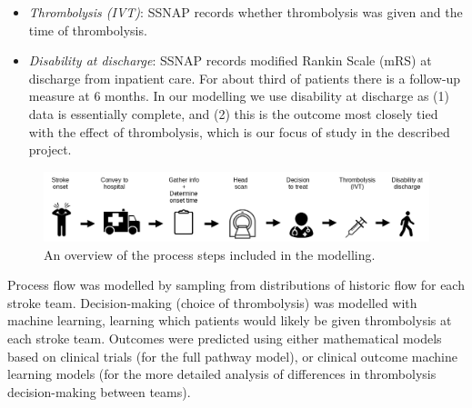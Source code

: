 \begin{itemize}
    \item \textit{Thrombolysis (IVT)}: SSNAP records whether thrombolysis was given and the time of thrombolysis.

    \item \textit{Disability at discharge}: SSNAP records modified Rankin Scale (mRS) at discharge from inpatient care. For about third of patients there is a follow-up measure at 6 months. In our modelling we use disability at discharge as (1) data is essentially complete, and (2) this is the outcome most closely tied with the effect of thrombolysis, which is our focus of study in the described project.

\end{itemize}

\begin{figure}[ht!]
    \centering
    \includegraphics[width=1.0\linewidth]{images/flow}
    \caption{An overview of the process steps included in the modelling.}
    \label{fig:flow}
\end{figure}

Process flow was modelled by sampling from distributions of historic flow for each stroke team. Decision-making (choice of thrombolysis) was modelled with machine learning, learning which patients would likely be given thrombolysis at each stroke team. Outcomes were predicted using either mathematical models based on clinical trials (for the full pathway model), or clinical outcome machine learning models (for the more detailed analysis of differences in thrombolysis decision-making between teams).
